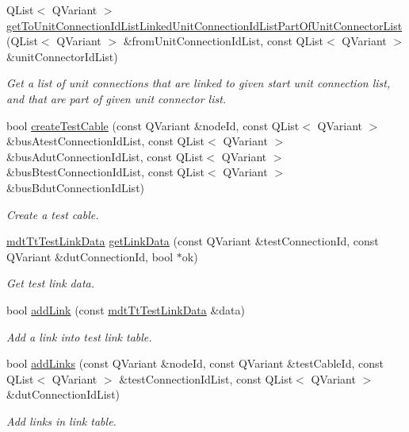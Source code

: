 \begin{DoxyCompactItemize}
Q\-List$<$ Q\-Variant $>$ \hyperlink{classmdt_tt_test_connection_cable_a77812e2dae0a0add4df09f2e0e3cfe67}{get\-To\-Unit\-Connection\-Id\-List\-Linked\-Unit\-Connection\-Id\-List\-Part\-Of\-Unit\-Connector\-List} (Q\-List$<$ Q\-Variant $>$ \&from\-Unit\-Connection\-Id\-List, const Q\-List$<$ Q\-Variant $>$ \&unit\-Connector\-Id\-List)
\begin{DoxyCompactList}\small\item\em Get a list of unit connections that are linked to given start unit connection list, and that are part of given unit connector list. \end{DoxyCompactList}\item 
bool \hyperlink{classmdt_tt_test_connection_cable_a119babb20dbb2a8f1c19f4865ef9239b}{create\-Test\-Cable} (const Q\-Variant \&node\-Id, const Q\-List$<$ Q\-Variant $>$ \&bus\-Atest\-Connection\-Id\-List, const Q\-List$<$ Q\-Variant $>$ \&bus\-Adut\-Connection\-Id\-List, const Q\-List$<$ Q\-Variant $>$ \&bus\-Btest\-Connection\-Id\-List, const Q\-List$<$ Q\-Variant $>$ \&bus\-Bdut\-Connection\-Id\-List)
\begin{DoxyCompactList}\small\item\em Create a test cable. \end{DoxyCompactList}\item 
\hyperlink{classmdt_tt_test_link_data}{mdt\-Tt\-Test\-Link\-Data} \hyperlink{classmdt_tt_test_connection_cable_af3bf15b6323aef10418e46d9ffb581ef}{get\-Link\-Data} (const Q\-Variant \&test\-Connection\-Id, const Q\-Variant \&dut\-Connection\-Id, bool $\ast$ok)
\begin{DoxyCompactList}\small\item\em Get test link data. \end{DoxyCompactList}\item 
bool \hyperlink{classmdt_tt_test_connection_cable_a6c047f97e4c822f8c3eac7fc3e2ae020}{add\-Link} (const \hyperlink{classmdt_tt_test_link_data}{mdt\-Tt\-Test\-Link\-Data} \&data)
\begin{DoxyCompactList}\small\item\em Add a link into test link table. \end{DoxyCompactList}\item 
bool \hyperlink{classmdt_tt_test_connection_cable_af4ba9704440ad113259c6688767ac5a5}{add\-Links} (const Q\-Variant \&node\-Id, const Q\-Variant \&test\-Cable\-Id, const Q\-List$<$ Q\-Variant $>$ \&test\-Connection\-Id\-List, const Q\-List$<$ Q\-Variant $>$ \&dut\-Connection\-Id\-List)
\begin{DoxyCompactList}\small\item\em Add links in link table. \end{DoxyCompactList}\item 

\end{DoxyCompactItemize}

